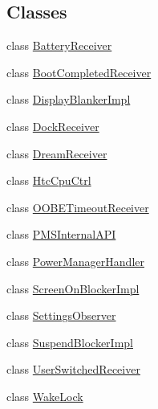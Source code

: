 \subsection*{Classes}
\begin{DoxyCompactItemize}
\item 
class \hyperlink{classcom_1_1android_1_1server_1_1power_1_1PowerManagerService_1_1BatteryReceiver}{Battery\-Receiver}
\item 
class \hyperlink{classcom_1_1android_1_1server_1_1power_1_1PowerManagerService_1_1BootCompletedReceiver}{Boot\-Completed\-Receiver}
\item 
class \hyperlink{classcom_1_1android_1_1server_1_1power_1_1PowerManagerService_1_1DisplayBlankerImpl}{Display\-Blanker\-Impl}
\item 
class \hyperlink{classcom_1_1android_1_1server_1_1power_1_1PowerManagerService_1_1DockReceiver}{Dock\-Receiver}
\item 
class \hyperlink{classcom_1_1android_1_1server_1_1power_1_1PowerManagerService_1_1DreamReceiver}{Dream\-Receiver}
\item 
class \hyperlink{classcom_1_1android_1_1server_1_1power_1_1PowerManagerService_1_1HtcCpuCtrl}{Htc\-Cpu\-Ctrl}
\item 
class \hyperlink{classcom_1_1android_1_1server_1_1power_1_1PowerManagerService_1_1OOBETimeoutReceiver}{O\-O\-B\-E\-Timeout\-Receiver}
\item 
class \hyperlink{classcom_1_1android_1_1server_1_1power_1_1PowerManagerService_1_1PMSInternalAPI}{P\-M\-S\-Internal\-A\-P\-I}
\item 
class \hyperlink{classcom_1_1android_1_1server_1_1power_1_1PowerManagerService_1_1PowerManagerHandler}{Power\-Manager\-Handler}
\item 
class \hyperlink{classcom_1_1android_1_1server_1_1power_1_1PowerManagerService_1_1ScreenOnBlockerImpl}{Screen\-On\-Blocker\-Impl}
\item 
class \hyperlink{classcom_1_1android_1_1server_1_1power_1_1PowerManagerService_1_1SettingsObserver}{Settings\-Observer}
\item 
class \hyperlink{classcom_1_1android_1_1server_1_1power_1_1PowerManagerService_1_1SuspendBlockerImpl}{Suspend\-Blocker\-Impl}
\item 
class \hyperlink{classcom_1_1android_1_1server_1_1power_1_1PowerManagerService_1_1UserSwitchedReceiver}{User\-Switched\-Receiver}
\item 
class \hyperlink{classcom_1_1android_1_1server_1_1power_1_1PowerManagerService_1_1WakeLock}{Wake\-Lock}
\end{DoxyCompactItemize}
